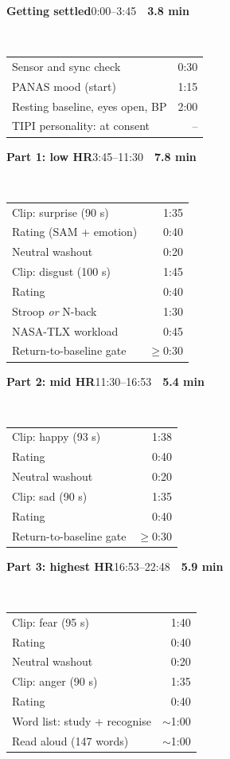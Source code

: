 \documentclass[aspectratio=169,10pt]{beamer}
\makeatletter
\newcommand{\card}[5]{%
  \begin{minipage}[t]{0.244\linewidth}
    \colorbox{#1}{\parbox{\dimexpr\linewidth-2\fboxsep}{\color{white}\tiny\textbf{#2}\hfill #3\ \textbar\ \textbf{#4}}}\\[-1pt]
    \tiny\setlength{\tabcolsep}{2pt}\renewcommand{\arraystretch}{0.95}%
    \begin{tabular*}{\linewidth}{@{}l@{\extracolsep{\fill}}r@{}}#5\end{tabular*}
  \end{minipage}}
\makeatother
\begin{document}
\begin{frame}[t]
\vspace{2pt}
\raggedright
\card{ink}{Getting settled}{0:00--3:45}{3.8 min}{%
  Sensor and sync check & 0:30\\
  PANAS mood (start) & 1:15\\
  Resting baseline, eyes open, BP & 2:00\\
  {\color{soft}TIPI personality: at consent} & --\\}\hfill
\card{sky}{Part 1: low HR}{3:45--11:30}{7.8 min}{%
  Clip: surprise (90 s) & 1:35\\
  Rating (SAM + emotion) & 0:40\\
  Neutral washout & 0:20\\
  Clip: disgust (100 s) & 1:45\\
  Rating & 0:40\\
  Stroop \textit{or} N-back & 1:30\\
  NASA-TLX workload & 0:45\\
  Return-to-baseline gate & $\geq$0:30\\}\hfill
\card{sky!80!black}{Part 2: mid HR}{11:30--16:53}{5.4 min}{%
  Clip: happy (93 s) & 1:38\\
  Rating & 0:40\\
  Neutral washout & 0:20\\
  Clip: sad (90 s) & 1:35\\
  Rating & 0:40\\
  Return-to-baseline gate & $\geq$0:30\\}\hfill
\card{sky!60!black}{Part 3: highest HR}{16:53--22:48}{5.9 min}{%
  Clip: fear (95 s) & 1:40\\
  Rating & 0:40\\
  Neutral washout & 0:20\\
  Clip: anger (90 s) & 1:35\\
  Rating & 0:40\\
  Word list: study + recognise & $\sim$1:00\\
  Read aloud (147 words) & $\sim$1:00\\}


\end{frame}
\end{document}
